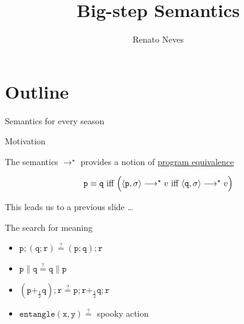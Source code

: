 \documentclass{beamer}
\author[Renato Neves]{Renato Neves}
\date{}
\begin{document}
\title{Big-step Semantics}

\frame[plain]{\titlepage}

\section{Outline}

\begin{frame}{Semantics for every season}

        \hspace*{+5pt}

\end{frame}

\begin{frame}{Motivation}

        The semantics $\longrightarrow^\star$ provides a notion
        of \alert{\underline{program equivalence}}

        \[
                \mathtt{p} \equiv \mathtt{q}
                \text{ iff }
                \Big (\langle \mathtt{p}, \sigma \rangle \longrightarrow^\star v \text{ iff }
                \langle \mathtt{q}, \sigma \rangle \longrightarrow^\star v \Big )
        \]


        \pause
        This leads us to a previous slide \dots
\end{frame}

\begin{frame}{ The search for meaning }
    \begin{examples}
    \begin{itemize}
            \item $\mathtt{p ; (q ; r)} \stackrel{?}{=} \mathtt{(p ; q) ; r} $
                    \\[10pt]
            \item $\mathtt{p \parallel q \stackrel{?}{=} q \parallel p} $ 
                    \\[10pt]
            \item $\mathtt{\left (p +_{\frac{1}{2}} q \right ) ; r 
                    \stackrel{?}{=} p ; r +_{\frac{1}{2}} q ; r}$ 
                    \\[10pt]
            \item $\mathtt{entangle(x,y) \stackrel{?}{=}}$ spooky action 
    \end{itemize}
  \end{examples}
\end{frame}
\end{document}
